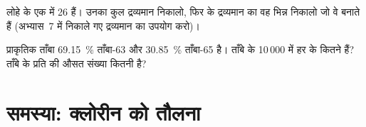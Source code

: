 \begin{exercise}[$\star\star\star$]\label{exo:g9:inside-the-atom:11}
लोहे के एक  में 26  हैं। उनका कुल द्रव्यमान निकालो, फिर
  के द्रव्यमान का वह भिन्न निकालो जो वे बनाते हैं (अभ्यास~7
में निकाले गए द्रव्यमान का उपयोग करो)।
\end{exercise}

\begin{exercise}[$\star\star\star$]\label{exo:g9:inside-the-atom:12}
प्राकृतिक ताँबा \qty{69.15}{\percent} ताँबा-63 और \qty{30.85}{\percent}
ताँबा-65 है। ताँबे के 10\,000  में हर  के कितने हैं?
ताँबे के प्रति   की औसत संख्या कितनी है?
\end{exercise}

\clearpage %
\section{समस्या: क्लोरीन को तौलना}


